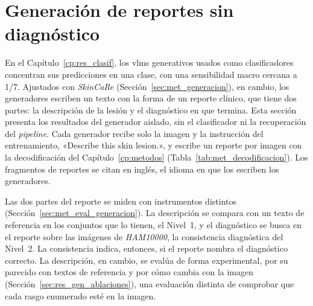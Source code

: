 \section{Generación de reportes sin diagnóstico}
\label{sec:res_gen_directa}

En el Capítulo~\ref{cp:res_clasif}, los \glspl{vlm} generativos usados como clasificadores concentran sus predicciones en una
clase, con una sensibilidad macro cercana a 1/7. Ajustados con \emph{SkinCaRe} (Sección~\ref{sec:met_generacion}), en cambio, los generadores
escriben un texto con la forma de un reporte clínico, que tiene dos partes: la descripción de la lesión y el
diagnóstico en que termina. Esta sección presenta los resultados del generador aislado, sin el clasificador ni la
recuperación del \emph{pipeline}. Cada generador recibe solo la imagen y la instrucción del entrenamiento, «Describe
this skin lesion.», y escribe un reporte por imagen con la decodificación del Capítulo~\ref{cp:metodos}
(Tabla~\ref{tab:met_decodificacion}). Los fragmentos de reportes se citan en inglés, el idioma en que los escriben los
generadores.

Las dos partes del reporte se miden con instrumentos distintos (Sección~\ref{sec:met_eval_generacion}). La
descripción se compara con un texto de referencia en los conjuntos que lo tienen, el Nivel~1, y el diagnóstico se
busca en el reporte sobre las imágenes de \emph{HAM10000}, la consistencia diagnóstica del Nivel~2. La consistencia indica, entonces, si el reporte nombra el diagnóstico correcto. La descripción, en cambio, se evalúa de
forma experimental, por su parecido con textos de referencia y por cómo cambia con la imagen
(Sección~\ref{sec:res_gen_ablaciones}), una evaluación distinta de comprobar que cada rasgo enumerado esté en la imagen.

